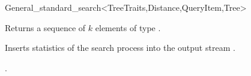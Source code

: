 \begin{ccRefClass}{General_standard_search<TreeTraits,Distance,QueryItem,Tree>}
\ccOperations

{Returns a sequence of $k$ elements of type }. 

\begin{ccAdvanced}
{
Inserts statistics of the search process into the output stream .
}
\end{ccAdvanced}

\ccSeeAlso

.

\end{ccRefClass}


